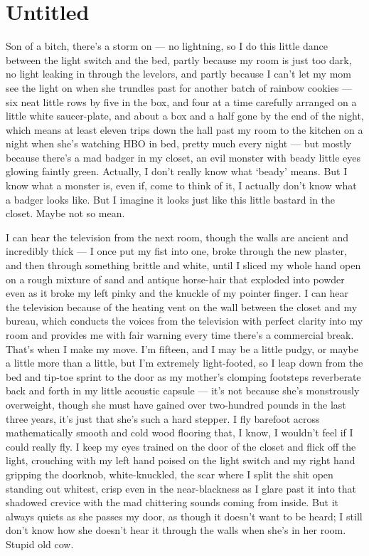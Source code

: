 \chapter{Untitled}


Son of a bitch, there's a storm on --- no lightning, so I
do this little dance between the light switch and the bed, partly
because my room is just too dark, no light leaking in through the
levelors, and partly because I can't let my mom see the light
on when she trundles past for another batch of rainbow cookies
--- six neat little rows by five in the box, and four at a time
carefully arranged on a little white saucer-plate, and about a box
and a half gone by the end of the night, which means at least
eleven trips down the hall past my room to the kitchen on a night
when she's watching HBO in bed, pretty much every night
--- but mostly because there's a mad badger in my closet,
an evil monster with beady little eyes glowing faintly green.
Actually, I don't really know what `beady' means.
But I know what a monster is, even if, come to think of it, I
actually don't know what a badger looks like. But I imagine
it looks just like this little bastard in the closet. Maybe not so
mean.

I can hear the television from the next room, though the walls are
ancient and incredibly thick --- I once put my fist into one,
broke through the new plaster, and then through something brittle
and white, until I sliced my whole hand open on a rough mixture of
sand and antique horse-hair that exploded into powder even as it
broke my left pinky and the knuckle of my pointer finger. I can
hear the television because of the heating vent on the wall between
the closet and my bureau, which conducts the voices from the
television with perfect clarity into my room and provides me with
fair warning every time there's a commercial break.
That's when I make my move. I'm fifteen, and I may be a
little pudgy, or maybe a little more than a little, but I'm
extremely light-footed, so I leap down from the bed and tip-toe
sprint to the door as my mother's clomping footsteps
reverberate back and forth in my little acoustic capsule ---
it's not because she's monstrously overweight, though
she must have gained over two-hundred pounds in the last three
years, it's just that she's such a hard stepper. I fly
barefoot across mathematically smooth and cold wood flooring that,
I know, I wouldn't feel if I could really fly. I keep my eyes
trained on the door of the closet and flick off the light,
crouching with my left hand poised on the light switch and my right
hand gripping the doorknob, white-knuckled, the scar where I split
the shit open standing out whitest, crisp even in the
near-blackness as I glare past it into that shadowed crevice with
the mad chittering sounds coming from inside. But it always quiets
as she passes my door, as though it doesn't want to be heard;
I still don't know how she doesn't hear it through the
walls when she's in her room. Stupid old cow.

